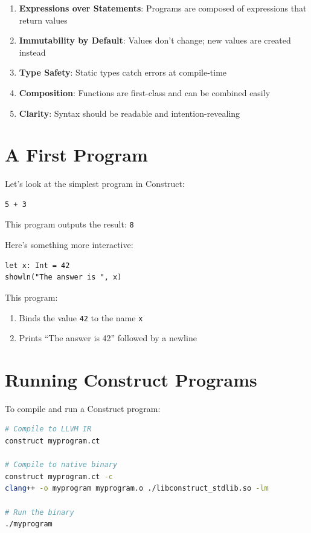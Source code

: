 \documentclass[11pt,twoside,openright]{book}
\begin{document}
\begin{enumerate}
    \item \textbf{Expressions over Statements}: Programs are composed of expressions that return values
    \item \textbf{Immutability by Default}: Values don't change; new values are created instead
    \item \textbf{Type Safety}: Static types catch errors at compile-time
    \item \textbf{Composition}: Functions are first-class and can be combined easily
    \item \textbf{Clarity}: Syntax should be readable and intention-revealing
\end{enumerate}

\section{A First Program}

Let's look at the simplest program in Construct:

\begin{lstlisting}[language=ConstructLang]
5 + 3
\end{lstlisting}

This program outputs the result: \texttt{8}

Here's something more interactive:

\begin{lstlisting}[language=ConstructLang]
let x: Int = 42
showln("The answer is ", x)
\end{lstlisting}

This program:
\begin{enumerate}
    \item Binds the value \texttt{42} to the name \texttt{x}
    \item Prints ``The answer is 42'' followed by a newline
\end{enumerate}

\section{Running Construct Programs}

To compile and run a Construct program:

\begin{lstlisting}[language=bash]
# Compile to LLVM IR
construct myprogram.ct

# Compile to native binary
construct myprogram.ct -c
clang++ -o myprogram myprogram.o ./libconstruct_stdlib.so -lm

# Run the binary
./myprogram
\end{lstlisting}
\end{document}
